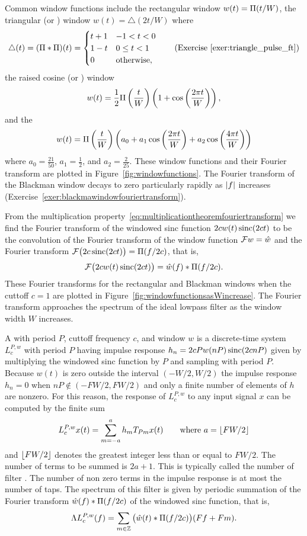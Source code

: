 Common window functions include the rectangular window $w(t) = \Pi(t/W)$, the triangular (or ) window $w(t) = \bigtriangleup(2t/W)$ where 
\[
\bigtriangleup(t) = (\Pi * \Pi)(t)  = \begin{cases}
t + 1 & -1 < t < 0 \\
1 - t & 0 \leq t < 1 \\
0 & \text{otherwise}, 
\end{cases} \qquad \text{(Exercise~\ref{exer:triangle_pulse_ft})}
\]
the raised cosine (or ) window
\[
w(t)  = \frac{1}{2} \Pi\left(\frac{t}{W}\right)\left( 1 + \cos\left(\frac{2\pi t}{W}\right) \right),
\]
and the ~\citep{BlackmanTukeywindows}
\begin{equation}\label{eq:blackmanwindow}
w(t) = \Pi\left(\frac{t}{W}\right) \left( a_0 + a_1 \cos\left(\frac{2\pi t}{W}\right) + a_2 \cos\left(\frac{4\pi t}{W}\right) \right) 
\end{equation}
where $a_0 = \tfrac{21}{50}$, $a_1 = \tfrac{1}{2}$, and $a_2 = \tfrac{2}{25}$.  These window functions and their Fourier transform are plotted in Figure~\ref{fig:windowfunctions}.  The Fourier transform of the Blackman window decays to zero particularly rapidly as $\left\vert f \right\vert$ increases (Exercise~\ref{exer:blackmawindowfouriertransform}).

From the multiplication property~\eqref{eq:multiplicationtheoremfouriertransform} we find the Fourier transform of the windowed sinc function $2c w(t) \operatorname{sinc}(2ct)$ to be the convolution of the Fourier transform of the window function ${\mathcal F} w = \hat{w}$ and the Fourier transform ${\mathcal F}\big( 2c\operatorname{sinc}(2ct) \big) = \Pi(f/2c)$, that is,  
\[
{\mathcal F}\big( 2c w(t) \operatorname{sinc}(2ct)  \big) = \hat{w}(f) * \Pi(f/2c).
\]
These Fourier transforms for the rectangular and Blackman windows when the cuttoff $c = 1$ are plotted in Figure~\ref{fig:windowfunctionsasWincrease}.  The Fourier transform approaches the spectrum of the ideal lowpass filter as the window width $W$ increases.

A  with period $P$, cuttoff frequency $c$, and window $w$ is a discrete-time system $L_c^{P,w}$ with period $P$ having impulse response $h_n = 2c P w(nP) \operatorname{sinc}(2c nP)$ given by multiplying the windowed sinc function by $P$ and sampling with period $P$.  Because $w(t)$ is zero outside the interval $(-W/2, W/2)$ the impulse response $h_n = 0$ when $n P \notin (-FW/2, FW/2)$ and only a finite number of elements of $h$ are nonzero.  For this reason, the response of $L_c^{P,w}$ to any input signal $x$ can be computed by the finite sum
\[
L_c^{P,w}x(t) = \sum_{m = -a}^a h_m T_{Pm}x(t) \qquad \text{where $a = {\left\lfloor FW/2 \right\rfloor}$}
\]
and ${\left\lfloor FW/2 \right\rfloor}$ denotes the greatest integer less than or equal to $FW/2$.  The number of terms to be summed is $2a + 1$.  This is typically called the number of filter .  The number of non zero terms in the impulse response is at most the number of taps.  The spectrum of this filter is given by periodic summation of the Fourier transform $\hat{w}(f) * \Pi(f/2c)$ of the windowed sinc function, that is,
\[
\Lambda L_c^{P,w}(f) = \sum_{m \in {\mathbb Z}} \big(\hat{w}(t) *  \Pi(f/2c) \big)(Ff + Fm).
\]

